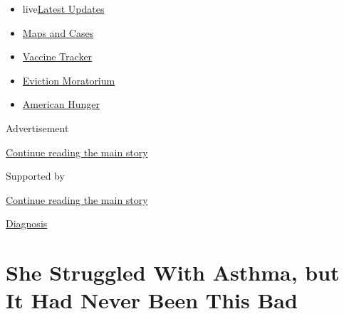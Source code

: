 \begin{itemize}
\tightlist
\item
  live\href{https://www.nytimes3xbfgragh.onion/2020/09/08/world/covid-19-coronavirus.html?name=styln-coronavirus-national\&region=TOP_BANNER\&block=storyline_menu_recirc\&action=click\&pgtype=Article\&impression_id=81444340-f1c4-11ea-9f8d-c5c4a80db310\&variant=undefined}{Latest
  Updates}
\item
  \href{https://www.nytimes3xbfgragh.onion/interactive/2020/us/coronavirus-us-cases.html?name=styln-coronavirus-national\&region=TOP_BANNER\&block=storyline_menu_recirc\&action=click\&pgtype=Article\&impression_id=81444341-f1c4-11ea-9f8d-c5c4a80db310\&variant=undefined}{Maps
  and Cases}
\item
  \href{https://www.nytimes3xbfgragh.onion/interactive/2020/science/coronavirus-vaccine-tracker.html?name=styln-coronavirus-national\&region=TOP_BANNER\&block=storyline_menu_recirc\&action=click\&pgtype=Article\&impression_id=81444342-f1c4-11ea-9f8d-c5c4a80db310\&variant=undefined}{Vaccine
  Tracker}
\item
  \href{https://www.nytimes3xbfgragh.onion/2020/09/02/your-money/eviction-moratorium-covid.html?name=styln-coronavirus-national\&region=TOP_BANNER\&block=storyline_menu_recirc\&action=click\&pgtype=Article\&impression_id=81446a50-f1c4-11ea-9f8d-c5c4a80db310\&variant=undefined}{Eviction
  Moratorium}
\item
  \href{https://www.nytimes3xbfgragh.onion/interactive/2020/09/02/magazine/food-insecurity-hunger-us.html?name=styln-coronavirus-national\&region=TOP_BANNER\&block=storyline_menu_recirc\&action=click\&pgtype=Article\&impression_id=81446a51-f1c4-11ea-9f8d-c5c4a80db310\&variant=undefined}{American
  Hunger}
\end{itemize}

Advertisement

\protect\hyperlink{after-top}{Continue reading the main story}

Supported by

\protect\hyperlink{after-sponsor}{Continue reading the main story}

\href{/column/diagnosis}{Diagnosis}

\hypertarget{she-struggled-with-asthma-but-it-had-never-been-this-bad}{%
\section{She Struggled With Asthma, but It Had Never Been This
Bad}\label{she-struggled-with-asthma-but-it-had-never-been-this-bad}}

